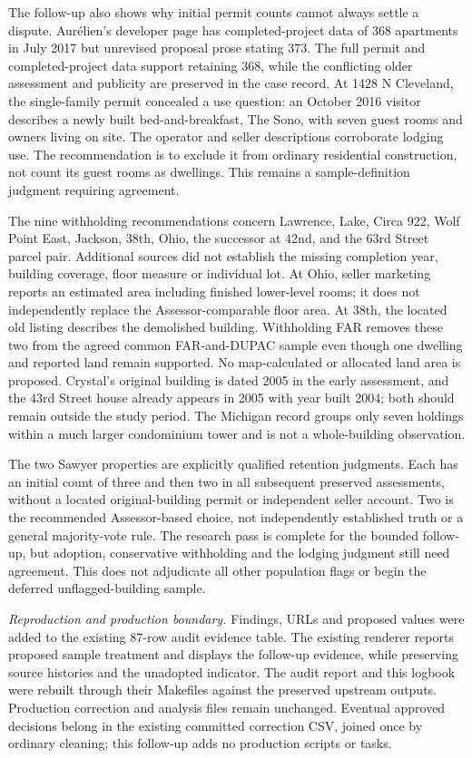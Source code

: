 The follow-up also shows why initial permit counts cannot always settle
a dispute. Aur\'elien's developer page has completed-project data of
368 apartments in July 2017 but unrevised proposal prose stating 373.
The full permit and completed-project data support retaining 368,
while the conflicting older assessment and publicity are preserved in
the case record. At 1428 N Cleveland, the single-family permit concealed
a use question: an October 2016 visitor describes a newly built
bed-and-breakfast, The Sono, with seven guest rooms and owners living
on site. The operator and seller descriptions corroborate lodging use.
The recommendation is to exclude it from ordinary residential
construction, not count its guest rooms as dwellings. This remains a
sample-definition judgment requiring agreement.

The nine withholding recommendations concern Lawrence, Lake,
Circa 922, Wolf Point East, Jackson, 38th, Ohio, the successor at 42nd,
and the 63rd Street parcel pair. Additional sources did not establish
the missing completion year, building coverage, floor measure or
individual lot. At Ohio, seller marketing reports an estimated area
including finished lower-level rooms; it does not independently replace
the Assessor-comparable floor area. At 38th, the located old listing
describes the demolished building. Withholding FAR removes these two
from the agreed common FAR-and-DUPAC sample even though one dwelling
and reported land remain supported. No map-calculated or allocated
land area is proposed. Crystal's original building is dated 2005 in
the early assessment, and the 43rd Street house already appears in
2005 with year built 2004; both should remain outside the study period.
The Michigan record groups only seven holdings within a much larger
condominium tower and is not a whole-building observation.

The two Sawyer properties are explicitly qualified retention judgments.
Each has an initial count of three and then two in all subsequent
preserved assessments, without a located original-building permit or
independent seller account. Two is the recommended Assessor-based
choice, not independently established truth or a general majority-vote
rule. The research pass is complete for the bounded follow-up, but
adoption, conservative withholding and the lodging judgment still need
agreement. This does not adjudicate all other population flags or begin
the deferred unflagged-building sample.

\textit{Reproduction and production boundary.} Findings, URLs and
proposed values were added to the existing 87-row audit evidence table.
The existing renderer reports proposed sample treatment and displays
the follow-up evidence, while preserving source histories and the
unadopted indicator. The audit report and this logbook were rebuilt
through their Makefiles against the preserved upstream outputs.
Production correction and analysis files remain unchanged. Eventual
approved decisions belong in the existing committed correction CSV,
joined once by ordinary cleaning; this follow-up adds no production
scripts or tasks.


